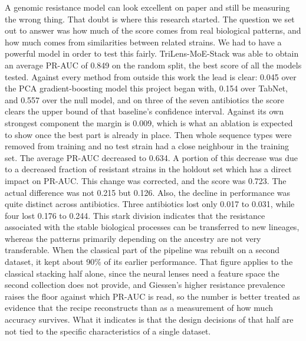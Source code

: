 \documentclass[journal]{IEEEtran}
\begin{document}
A genomic resistance model can look excellent on paper and still be measuring the
wrong thing. That doubt is where this research started. The question we set out to
answer was how much of the score comes from real biological patterns, and how much
comes from similarities between related strains. We had to have a powerful model in
order to test this fairly. TriLens-MoE-Stack was able to obtain an average PR-AUC of
0.849 on the random split, the best score of all the models tested. Against every
method from outside this work the lead is clear: 0.045 over the PCA gradient-boosting
model this project began with, 0.154 over TabNet, and 0.557 over the null model, and
on three of the seven antibiotics the score clears the upper bound of that baseline's
confidence interval. Against its own strongest component the margin is 0.009, which is
what an ablation is expected to show once the best part is already in place. Then
whole sequence types were removed from training and no test strain had a close
neighbour in the training set. The average PR-AUC decreased to 0.634. A portion of
this decrease was due to a decreased fraction of resistant strains in the holdout set
which has a direct impact on PR-AUC. This change was corrected, and the score was
0.723. The actual difference was not 0.215 but 0.126. Also, the decline in performance
was quite distinct across antibiotics. Three antibiotics lost only 0.017 to 0.031,
while four lost 0.176 to 0.244. This stark division indicates that the resistance
associated with the stable biological processes can be transferred to new lineages,
whereas the patterns primarily depending on the ancestry are not very transferable.
When the classical part of the pipeline was rebuilt on a second dataset, it kept about
90\% of its earlier performance. That figure applies to the classical stacking half
alone, since the neural lenses need a feature space the second collection does not
provide, and Giessen's higher resistance prevalence raises the floor against which
PR-AUC is read, so the number is better treated as evidence that the recipe
reconstructs than as a measurement of how much accuracy survives. What it indicates is
that the design decisions of that half are not tied to the specific characteristics of
a single dataset.
\end{document}
